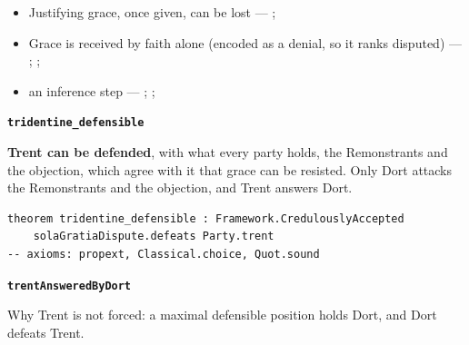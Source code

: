 \documentclass[11pt]{article}
\begin{document}
\begin{itemize}
\begin{itemize}
\item Justifying grace, once given, can be lost --- \cite[II-II q.24 a.11]{aquinas-summa-1920}; \cite[Trent, Session VI (1547), canon 23]{tanner-decrees-1990}
\item Grace is received by faith alone (encoded as a denial, so it ranks disputed) --- \cite[II-II q.4 a.3]{aquinas-summa-1920}; \cite[I-II q.113 a.4 ad 1]{aquinas-summa-1920}; \cite[Trent, Session VI (1547), canon 9]{tanner-decrees-1990}
\item an inference step --- \cite{pohle-molinism-1911}; \cite[I-II q.112 a.3]{aquinas-summa-1920}; \cite[ch. VII]{garrigou-lagrange-grace-1952}
\end{itemize}
\end{itemize}
\par\medskip\noindent\textbf{\texttt{tridentine\_\allowbreak{}defensible}}\par\nobreak\noindent
\textbf{Trent can be defended}, with what every party holds, the Remonstrants and the objection, which agree with it that grace can be resisted. Only Dort attacks the Remonstrants and the objection, and Trent answers Dort.

{\small\begin{verbatim}
theorem tridentine_defensible : Framework.CredulouslyAccepted
    solaGratiaDispute.defeats Party.trent
-- axioms: propext, Classical.choice, Quot.sound
\end{verbatim}}
\par\medskip\noindent\textbf{\texttt{trent\allowbreak{}Answered\allowbreak{}By\allowbreak{}Dort}}\par\nobreak\noindent
Why Trent is not forced: a maximal defensible position holds Dort, and Dort defeats Trent.
\end{document}
